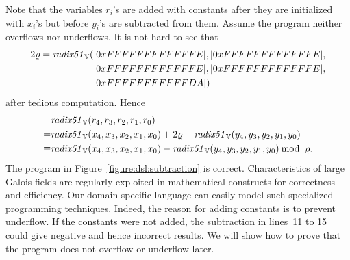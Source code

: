 Note that the variables ${r}_i$'s are added with constants after they are initialized with ${x}_i$'s but before ${y}_i$'s are subtracted from them.
Assume the program  neither overflows nor underflows.
It is not hard to see that
\[
\begin{aligned}
2\varrho = \mathit{radix51}_{\mathbb{V}} (&|0xFFFFFFFFFFFFE|, |0xFFFFFFFFFFFFE|, \\
          & |0xFFFFFFFFFFFFE|, |0xFFFFFFFFFFFFE|, \\
          & |0xFFFFFFFFFFFDA|)
\end{aligned}
\]
after tedious computation.
Hence
\[
\begin{aligned}
  & \mathit{radix51}_{\mathbb{V}}({r}_4, {r}_3, {r}_2, {r}_1, {r}_0) \\
= & \mathit{radix51}_{\mathbb{V}}({x}_4, {x}_3, {x}_2, {x}_1, {x}_0) + 2 \varrho - \mathit{radix51}_{\mathbb{V}}({y}_4, {y}_3, {y}_2, {y}_1, {y}_0) \\
\equiv & \mathit{radix51}_{\mathbb{V}}({x}_4, {x}_3, {x}_2, {x}_1, {x}_0) - \mathit{radix51}_{\mathbb{V}}({y}_4, {y}_3, {y}_2, {y}_1, {y}_0) \mathbin{\textmd{mod}}\ \varrho.
\end{aligned}
\]
The program in Figure~\ref{figure:dsl:subtraction} is correct.
Characteristics of large Galois fields are regularly exploited in mathematical constructs for correctness and efficiency.
Our domain specific language can easily model such specialized programming techniques.
Indeed, the reason for adding constants is to prevent underflow.
If the constants were not added, the subtraction in lines~11 to 15 could give negative and hence incorrect results.
We will show how to prove that the program does not overflow or underflow later.

